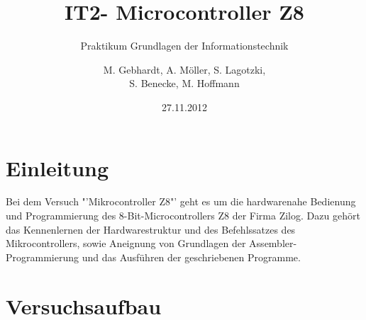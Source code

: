 
\usepackage{paralist} %
\usepackage{circuitikz} %
\usepackage{picins}
\usepackage{wasysym}
\usepackage{pict2e}
\usepackage{lscape}
\usepackage{soul}
\usepackage[right]{eurosym}
\usepackage{array}
\usepackage{multirow}
\usepackage{tikz}
\usetikzlibrary{shapes,arrows}
\title{IT2- Microcontroller Z8}
\subtitle{Praktikum Grundlagen der Informationstechnik}
\author{M. Gebhardt, A. Möller, S. Lagotzki,\\S. Benecke, M. Hoffmann}
\date{27.11.2012}
\publishers{Marc.Gebhardt@st.ovgu.de}

\maketitle
{}
\begingroup
  \pagestyle{empty}
  \tableofcontents
  \newpage
\endgroup  
\setcounter{page}{1}


\section{Einleitung}
Bei dem Versuch "'Mikrocontroller Z8"' geht es um die hardwarenahe Bedienung und Programmierung des 8-Bit-Microcontrollers Z8 der Firma Zilog. Dazu gehört das Kennenlernen der Hardwarestruktur und des Befehlssatzes des Mikrocontrollers, sowie Aneignung von Grundlagen der Assembler-Programmierung und das Ausführen der geschriebenen Programme. 

\section{Versuchsaufbau}

